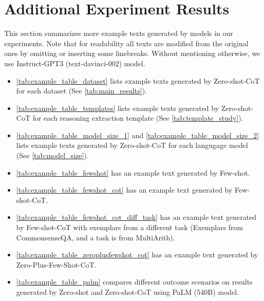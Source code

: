 \documentclass{article}
\newcommand{\ours}{Zero-shot-CoT\xspace}
\newcommand{\theirs}{Few-shot-CoT\xspace}
\newcommand{\theirsz}{Zero-shot\xspace}
\newcommand{\theirsf}{Few-shot\xspace}
\begin{document}


\section{Additional Experiment Results}
\label{appx:further_experiment}

This section summarizes more example texts generated by models in our experiments.
Note that for readability all texts are modified from the original ones by omitting or inserting some linebreaks. Without mentioning otherwise, we use Instruct-GPT3 (text-davinci-002) model.

\begin{itemize}
    \item \autoref{tab:example_table_dataset} lists example texts generated by \ours for each dataset (See \autoref{tab:main_results}).
    \item \autoref{tab:example_table_templates} lists example texts generated by \ours for each reasoning extraction template (See \autoref{tab:template_study}).
    \item \autoref{tab:example_table_model_size_1} and \autoref{tab:example_table_model_size_2} lists example texts generated by \ours for each langugage model (See \autoref{tab:model_size}).
    \item \autoref{tab:example_table_fewshot} has an example text generated by \theirsf.
    \item \autoref{tab:example_table_fewshot_cot} has an example text generated by \theirs.
    \item \autoref{tab:example_table_fewshot_cot_diff_task} has an example text generated by \theirs with exemplars from a different task (Exemplars from CommonsenseQA, and a task is from MultiArith).
    \item \autoref{tab:example_table_zeroplusfewshot_cot} has an example text generated by Zero-Plus-Few-Shot-CoT.
    \item \autoref{tab:example_table_palm} compares different outcome scenarios on results generated by \theirsz and \ours using PaLM (540B) model.
\end{itemize}




\end{document}
